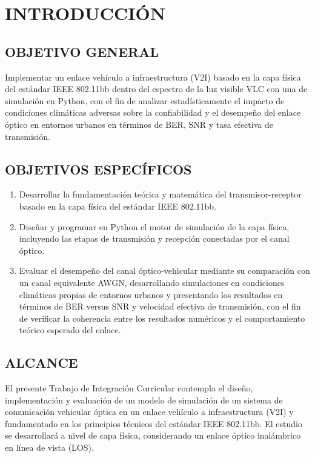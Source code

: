 \chapter*{INTRODUCCIÓN}
\setcounter{chapter}{1}

\section{OBJETIVO GENERAL}
Implementar un enlace vehículo a infraestructura (V2I) basado en la capa física del estándar IEEE 802.11bb dentro del espectro de la luz visible VLC con una de simulación en Python, con el fin de analizar estadísticamente el impacto de condiciones climáticas adversas sobre la confiabilidad y el desempeño del enlace óptico en entornos urbanos en términos de BER, SNR y tasa efectiva de transmisión.

\section{OBJETIVOS ESPECÍFICOS}
\begin{enumerate}
	\item Desarrollar la fundamentación teórica y matemática del transmisor-receptor basado en la capa física del estándar IEEE 802.11bb.
	\item Diseñar y programar en Python el motor de simulación de la capa física, incluyendo las etapas de transmisión y recepción conectadas por el canal óptico.
	\item Evaluar el desempeño del canal óptico-vehicular mediante su comparación con un canal equivalente AWGN, desarrollando simulaciones en condiciones climáticas propias de entornos urbanos y presentando los resultados en términos de BER versus SNR y velocidad efectiva de transmisión, con el fin de verificar la coherencia entre los resultados numéricos y el comportamiento teórico esperado del enlace.
\end{enumerate}

\section{ALCANCE}
El presente Trabajo de Integración Curricular contempla el diseño, implementación y evaluación de un modelo de simulación de un sistema de comunicación vehicular óptica en un enlace vehículo a infraestructura (V2I) y fundamentado en los principios técnicos del estándar IEEE 802.11bb. El estudio se desarrollará a nivel de capa física, considerando un enlace óptico inalámbrico en línea de vista (LOS).

